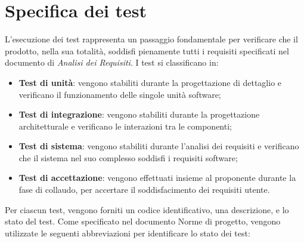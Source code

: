 \section{Specifica dei test}
L'esecuzione dei test rappresenta un passaggio fondamentale per verificare che 
il prodotto, nella sua totalità, soddisfi pienamente tutti i requisiti specificati
nel documento di \textit{Analisi dei Requisiti}.
I test si classificano in:
\begin{itemize}
    \item \textbf{Test di unità}: vengono stabiliti durante la progettazione di
    dettaglio e verificano il funzionamento delle singole unità software;
    \item \textbf{Test di integrazione}: vengono stabiliti durante la progettazione
    architetturale e verificano le interazioni tra le componenti;
    \item \textbf{Test di sistema}: vengono stabiliti durante l'analisi dei requisiti
    e verificano che il sistema nel suo complesso soddisfi i requisiti software;
    \item \textbf{Test di accettazione}: vengono effettuati insieme al proponente 
    durante la fase di collaudo, per accertare il soddisfacimento dei requisiti utente.
\end{itemize}
Per ciascun test, vengono forniti un codice identificativo, una descrizione, e
lo stato del test. 
Come specificato nel documento Norme di progetto, vengono
utilizzate le seguenti abbreviazioni per identificare lo stato dei test:
